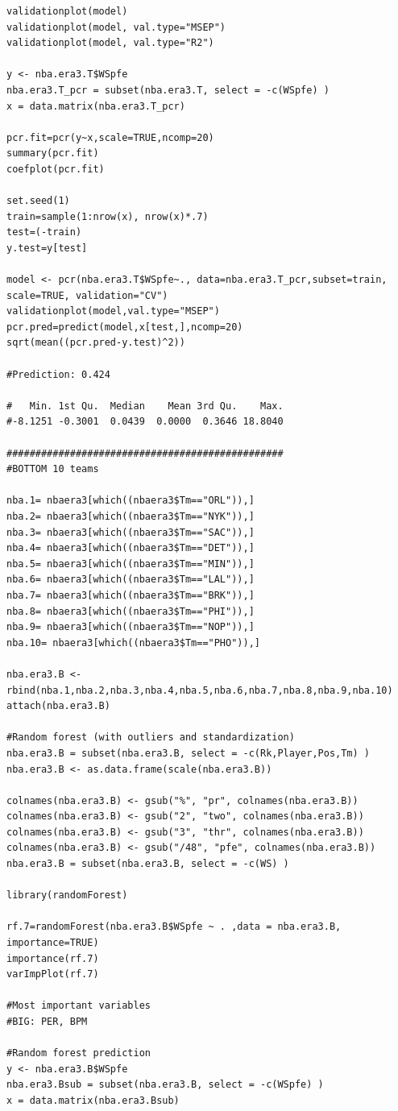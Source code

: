 \documentclass[11pt,letterpaper]{amsart}
\begin{document}
\begin{lstlisting}[breaklines]
validationplot(model)
validationplot(model, val.type="MSEP")
validationplot(model, val.type="R2")

y <- nba.era3.T$WSpfe
nba.era3.T_pcr = subset(nba.era3.T, select = -c(WSpfe) )
x = data.matrix(nba.era3.T_pcr)

pcr.fit=pcr(y~x,scale=TRUE,ncomp=20)
summary(pcr.fit)
coefplot(pcr.fit)

set.seed(1)
train=sample(1:nrow(x), nrow(x)*.7)
test=(-train)
y.test=y[test]

model <- pcr(nba.era3.T$WSpfe~., data=nba.era3.T_pcr,subset=train, scale=TRUE, validation="CV")
validationplot(model,val.type="MSEP")
pcr.pred=predict(model,x[test,],ncomp=20)
sqrt(mean((pcr.pred-y.test)^2))

#Prediction: 0.424

#   Min. 1st Qu.  Median    Mean 3rd Qu.    Max. 
#-8.1251 -0.3001  0.0439  0.0000  0.3646 18.8040 

################################################
#BOTTOM 10 teams

nba.1= nbaera3[which((nbaera3$Tm=="ORL")),]
nba.2= nbaera3[which((nbaera3$Tm=="NYK")),]
nba.3= nbaera3[which((nbaera3$Tm=="SAC")),]
nba.4= nbaera3[which((nbaera3$Tm=="DET")),]
nba.5= nbaera3[which((nbaera3$Tm=="MIN")),]
nba.6= nbaera3[which((nbaera3$Tm=="LAL")),]
nba.7= nbaera3[which((nbaera3$Tm=="BRK")),]
nba.8= nbaera3[which((nbaera3$Tm=="PHI")),]
nba.9= nbaera3[which((nbaera3$Tm=="NOP")),]
nba.10= nbaera3[which((nbaera3$Tm=="PHO")),]

nba.era3.B <- rbind(nba.1,nba.2,nba.3,nba.4,nba.5,nba.6,nba.7,nba.8,nba.9,nba.10)
attach(nba.era3.B)

#Random forest (with outliers and standardization)
nba.era3.B = subset(nba.era3.B, select = -c(Rk,Player,Pos,Tm) )
nba.era3.B <- as.data.frame(scale(nba.era3.B))

colnames(nba.era3.B) <- gsub("%", "pr", colnames(nba.era3.B))
colnames(nba.era3.B) <- gsub("2", "two", colnames(nba.era3.B))
colnames(nba.era3.B) <- gsub("3", "thr", colnames(nba.era3.B))
colnames(nba.era3.B) <- gsub("/48", "pfe", colnames(nba.era3.B))
nba.era3.B = subset(nba.era3.B, select = -c(WS) )

library(randomForest)

rf.7=randomForest(nba.era3.B$WSpfe ~ . ,data = nba.era3.B, importance=TRUE)
importance(rf.7)
varImpPlot(rf.7)

#Most important variables 
#BIG: PER, BPM 

#Random forest prediction
y <- nba.era3.B$WSpfe
nba.era3.Bsub = subset(nba.era3.B, select = -c(WSpfe) )
x = data.matrix(nba.era3.Bsub)


\end{lstlisting}
\end{document}

